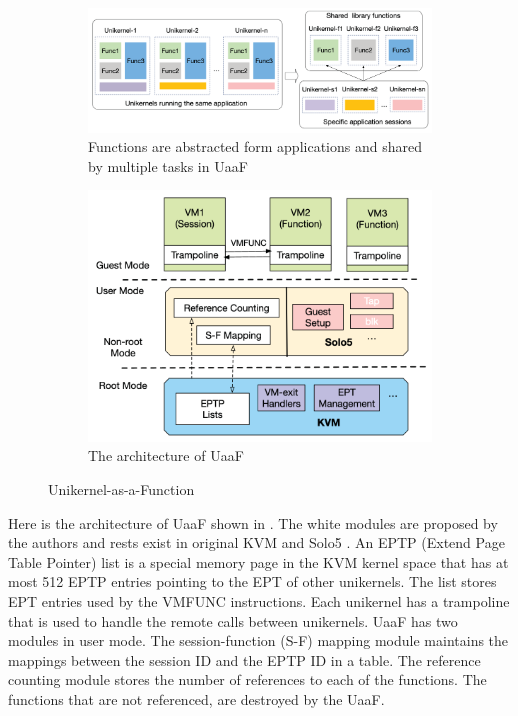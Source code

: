 \begin{figure}[!t]
\centering %

\begin{subfigure}{0.56\textwidth}
  \includegraphics[width=\linewidth]{images/uaaf_abstraction.png}
  \caption{Functions are abstracted form applications and shared by multiple tasks in UaaF}
  \label{fig:uaaf_abstraction}
\end{subfigure} \hfil%
\begin{subfigure}{0.42\textwidth}
  \includegraphics[width=\linewidth]{images/uaaf_architecture.png}
  \caption{The architecture of UaaF}
  \label{fig:uaaf_architecture}
\end{subfigure} \hfil%
\caption{Unikernel-as-a-Function \cite{tan2020unikernel}}
\label{fig:uaaf}
\end{figure}
Here is the architecture of UaaF shown in . The white modules are proposed by the authors and rests exist in original KVM \cite{kvm} and Solo5 \cite{solo5}. An EPTP (Extend Page Table Pointer) list is a special memory page in the KVM kernel space that has at most 512 EPTP entries pointing to the EPT of other unikernels. The list stores EPT entries used by the VMFUNC instructions. Each unikernel has a trampoline that is used to handle the remote calls between unikernels. UaaF has two modules in user mode. The session-function (S-F) mapping module maintains the mappings between the session ID and the EPTP ID in a table. The reference counting module stores the number of references to each of the functions. The functions that are not referenced, are destroyed by the UaaF.
